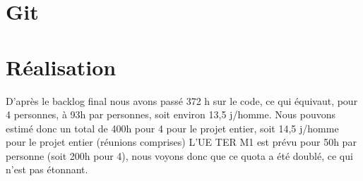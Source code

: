 \section{Git}


\section{Réalisation}
D'après le backlog final nous avons passé 372 h sur le code, ce qui équivaut, pour 4 personnes, à 93h par personnes, soit environ 13,5 j/homme.
Nous pouvons estimé donc un total de 400h pour 4 pour le projet entier, soit 14,5 j/homme pour le projet entier (réunions comprises)
L'UE TER M1 est prévu pour 50h par personne (soit 200h pour 4), nous voyons donc que ce quota a été doublé, ce qui n'est pas étonnant.
